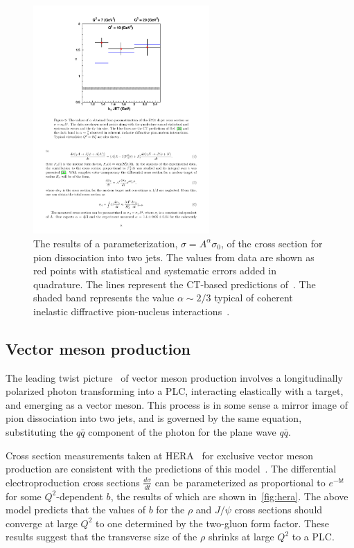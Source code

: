 \begin{figure}[!h]
    \centering
    \includegraphics[width=0.6\textwidth]{chap2/pion_dijet_alpha.pdf}
    \caption{The results of a parameterization, $\sigma=A^\alpha\sigma_0$, of
             the cross section for pion dissociation into two jets.
             The values from data are shown as red points with statistical and
             systematic errors added in quadrature.
             The lines represent the CT-based predictions
             of~\cite{Frankfurt_1993}.
             The shaded band represents the value $\alpha\sim2/3$ typical of
             coherent inelastic diffractive pion-nucleus
             interactions~\cite{Zielinsk_1983}.
            }
    \label{fig:pion_dijet_alpha}
\end{figure}



\subsection{Vector meson production}
The leading twist picture~\cite{Brodsky_1994} of vector meson production
involves a longitudinally polarized photon transforming into a PLC, interacting
elastically with a target, and emerging as a vector meson.
This process is in some sense a mirror image of pion dissociation into two jets,
and is governed by the same equation, substituting the $q\bar{q}$ component of
the photon for the plane wave $q\bar{q}$.


Cross section measurements taken at HERA~\cite{Chekanov_2004, Chekanov_2007}
for exclusive vector meson production are consistent with the predictions of
this model~\cite{Frankfurt_2005}.
The differential electroproduction cross sections $\frac{d\sigma}{dt}$ can be
parameterized as proportional to $e^{-bt}$ for some $Q^2$-dependent $b$, the
results of which are shown in~\ref{fig:hera}.
The above model predicts that the values of $b$ for the $\rho$ and $J/\psi$
cross sections should converge at large $Q^2$ to one determined by the
two-gluon form factor.
These results suggest that the transverse size of the $\rho$ shrinks at large
$Q^2$ to a PLC.

